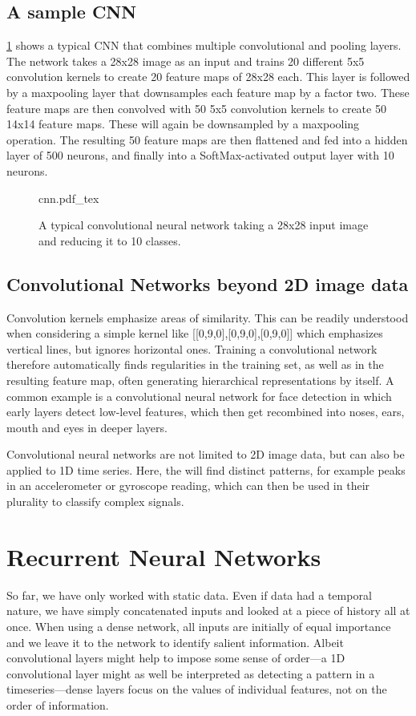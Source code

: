 \subsection{A sample CNN}

\cref{fig:cnn} shows a typical CNN that combines multiple convolutional and pooling layers. The network takes a 28x28 image as an input and trains 20 different 5x5 convolution kernels to create 20 feature maps of 28x28 each. This layer is followed by a maxpooling layer that downsamples each feature map by a factor two. These feature maps are then convolved with 50 5x5 convolution kernels to create 50 14x14 feature maps. These will again be downsampled by a maxpooling operation. The resulting 50 feature maps are then flattened and fed into a hidden layer of 500 neurons, and finally into a SoftMax-activated output layer with 10 neurons.

\begin{figure}[htb]
\tiny
    \centering
    \def\svgwidth{\textwidth}
    {cnn.pdf_tex}
    \caption{A typical convolutional neural network taking a 28x28 input image and reducing it to 10 classes.\label{fig:cnn}}
\end{figure}


\subsection{Convolutional Networks beyond 2D image data}

Convolution kernels emphasize areas of similarity. This can be readily understood when considering a simple kernel like [[0,9,0],[0,9,0],[0,9,0]] which emphasizes vertical lines, but ignores horizontal ones. Training a convolutional network therefore automatically finds regularities in the training set, as well as in the resulting feature map, often generating hierarchical representations by itself. A common example is a convolutional neural network for face detection in which early layers detect low-level features, which then get recombined into noses, ears, mouth and eyes in deeper layers.

Convolutional neural networks are not limited to 2D image data, but can also be applied to 1D time series. Here, the will find distinct patterns, for example peaks in an accelerometer or gyroscope reading, which can then be used in their plurality to classify complex signals. 

\section{Recurrent Neural Networks}
So far, we have only worked with static data. Even if data had a temporal nature, we have simply concatenated inputs and looked at a piece of history all at once. When using a dense network, all inputs are initially of equal importance and we leave it to the network to identify salient information. Albeit convolutional layers might help to impose some sense of order---a 1D convolutional layer might as well be interpreted as detecting a pattern in a timeseries---dense layers focus on the values of individual features, not on the order of information.


